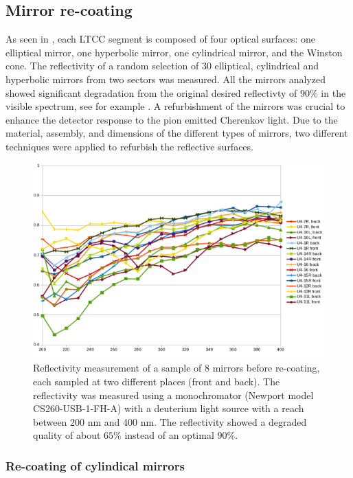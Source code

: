 \subsection{Mirror re-coating}

As seen in , each LTCC segment is composed of four optical surfaces: one elliptical mirror,
one hyperbolic mirror, one cylindrical mirror, and the Winston cone.
The reflectivity of a random selection of 30 elliptical, cylindrical and hyperbolic mirrors from two sectors was measured.
All the mirrors analyzed showed significant degradation from the original desired reflectivty of $90\%$ in the visible spectrum,
see for example .
A refurbishment of the mirrors was crucial to enhance the detector response to the pion emitted Cherenkov light.
Due to the material, assembly, and dimensions of the different types of mirrors, two different techniques were applied to refurbish the
reflective surfaces.

\begin{figure}
\centering
	\includegraphics[width=1.0\columnwidth,keepaspectratio]{img/mirrorsReflectivityBefore.png}
	\caption{Reflectivity measurement of a sample of 8 mirrors before re-coating, each sampled at two different places (front and back). The reflectivity
				was measured using a monochromator (Newport model CS260-USB-1-FH-A) with a deuterium light source with a reach
            between 200 nm and 400 nm. The reflectivity showed a degraded quality of about $65\%$ instead of an optimal $90\%$.}
	\label{fig:reflectivityBefore}
\end{figure}


\subsubsection{Re-coating of cylindical mirrors}

